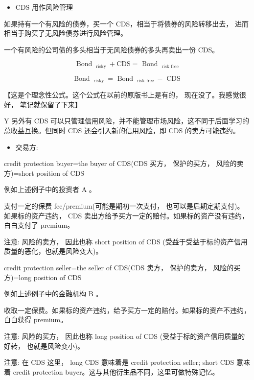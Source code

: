 \begin{itemize}
\item CDS 用作风险管理
\end{itemize}

如果持有一个有风险的债券，买一个 CDS，相当于将债券的风险转移出去， 进而相当于购买了无风险债券进行风险管理。

 一个有风险的公司债的多头相当于无风险债券的多头再卖出一份 CDS。



\[
{\text{ Bond }}_{\text{ risky }} + \mathrm{{CDS}} = {\text{ Bond }}_{\text{ risk free }}
\]

\[
{\text{ Bond }}_{\text{ risky }} = {\text{ Bond }}_{\text{ risk free }} - \text{ CDS }
\]



【这是个理念性公式。这个公式在以前的原版书上是有的， 现在没了。我感觉很好， 笔记就保留了下来】

Y 另外有 CDS 可以只管理信用风险，并不能管理市场风险，这不同于后面学习的总收益互换。但同时 CDS 还会引入新的信用风险，即 CDS 的卖方可能违约。

\begin{itemize}
\item 交易方:
\end{itemize}

credit protection buyer=the buyer of CDS(CDS 买方， 保护的买方， 风险的卖方)=short position of CDS

 例如上述例子中的投资者 \(\mathrm{A}\) 。

 支付一定的保费 fee/premium(可能是期初一次支付， 也可以是后期定期支付)。如果标的资产违约， CDS 卖出方给予买方一定的赔付。如果标的资产没有违约，白白支付了 premium。

 注意: 风险的卖方， 因此也称 short position of CDS (受益于受益于标的资产信用质量的恶化，也就是风险变大)。

credit protection seller=the seller of CDS(CDS 卖方， 保护的卖方， 风险的买方)=long position of CDS

 例如上述例子中的金融机构 \(\mathrm{B}\) 。

 收取一定保费。如果标的资产违约，给予买方一定的赔付。如果标的资产不违约，白白获得 premium。

 注意: 风险的买方， 因此也称 long position of CDS (受益于标的资产信用质量的好转， 也就是风险变小)。

注意: 在 CDS 这里， long CDS 意味着是 credit protection seller; short CDS 意味着 credit protection buyer。这与其他衍生品不同，这里可做特殊记忆。


